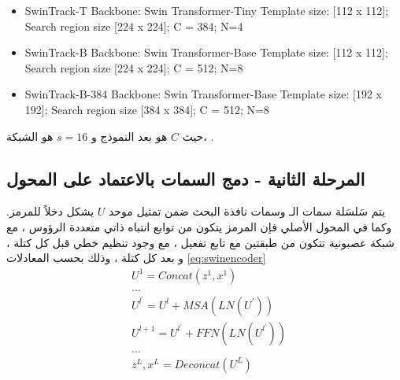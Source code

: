 	\begin{itemize}
		\item SwinTrack-T
		\newline
		Backbone: Swin Transformer-Tiny\cite{swintransformer}
		\newline
		Template size: [112 x 112]; Search region size [224 x 224]; C = 384; N=4
		
		\item SwinTrack-B
		\newline
		Backbone: Swin Transformer-Base\cite{swintransformer}
		\newline
		Template size: [112 x 112]; Search region size [224 x 224]; C = 512; N=8
		
		\item SwinTrack-B-384
		\newline
		Backbone: Swin Transformer-Base\cite{swintransformer}
		\newline
		Template size: [192 x 192]; Search region size [384 x 384]; C = 512; N=8
	\end{itemize}
حيث $C$ هو بعد النموذج و
$s=16$
هو 
الشبكة،
.
\newline
\subsection{المرحلة الثانية - دمج السمات بالاعتماد على المحول}
يتم سَلسَلة سمات الـ
وسمات نافذة البحث ضمن تمثيل موحد $U$ يشكل دخلاً للمرمز.
وكما في المحول الأصلي فإن المرمز يتكون من 
توابع انتباه ذاتي متعددة الرؤوس 
،
مع شبكة عصبونية 
تتكون من طبقتين مع تابع تفعيل
،
مع وجود تنظيم خطي 
قبل كل كتلة
،
و 
 بعد كل كتلة 
،
وذلك بحسب المعادلات 
\ref{eq:swinencoder}
\begin{equation} \label{eq:swinencoder}
\begin{split}
 &U^1 = Concat(z^1,x^1)\\
 &...\\
 &U^{l^\prime} = U^l + MSA(LN(U^\prime))\\
 &U^{l+1} = U^{l^\prime} + FFN(LN(U^{l^\prime}))\\
 &...\\
 &z^L,x^L = Deconcat(U^L)
\end{split}
\end{equation}


